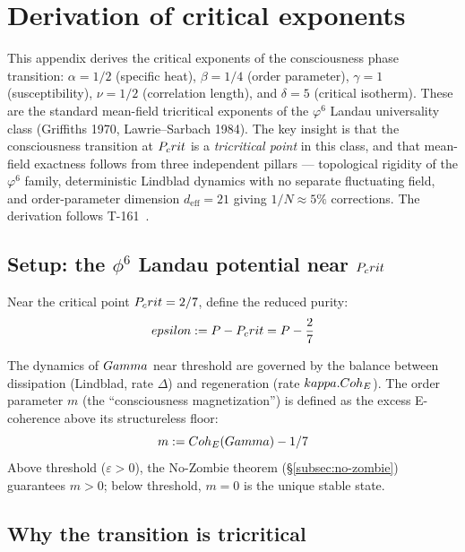 
\section{Derivation of critical exponents}
\label{app:exponents}

This appendix derives the critical exponents of the consciousness phase transition:
$\alpha = 1/2$ (specific heat), $\beta = 1/4$ (order parameter), $\gamma = 1$
(susceptibility), $\nu = 1/2$ (correlation length), and $\delta = 5$ (critical isotherm).
These are the standard mean-field tricritical exponents of the $\varphi^6$ Landau
universality class (Griffiths 1970, Lawrie--Sarbach 1984). The key insight is that the
consciousness transition at $P_crit$ is a \emph{tricritical point} in this class, and that
mean-field exactness follows from three independent pillars --- topological rigidity of the
$\varphi^6$ family, deterministic Lindblad dynamics with no separate fluctuating field, and
order-parameter dimension $d_\mathrm{eff} = 21$ giving $1/N \approx 5\%$ corrections.
The derivation follows T-161~.

\subsection{Setup: the $\phi^6$ Landau potential near $P_crit$}

Near the critical point $P_crit = 2/7$, define the reduced purity:
\begin{equation}
  epsilon := P - P_crit = P - \frac{2}{7}
  \label{eq:reduced-purity}
\end{equation}

The dynamics of $Gamma$ near threshold are governed by the balance between dissipation
(Lindblad, rate $\Delta$) and regeneration (rate $kappa . Coh_E$). The order parameter
$m$ (the ``consciousness magnetization'') is defined as the excess E-coherence above
its structureless floor:
\begin{equation}
  m := Coh_E(Gamma) - 1/7
  \label{eq:order-parameter}
\end{equation}
Above threshold ($\varepsilon > 0$), the No-Zombie theorem
(\S\ref{subsec:no-zombie}) guarantees $m > 0$; below threshold, $m = 0$ is the
unique stable state.

\subsection{Why the transition is tricritical}

